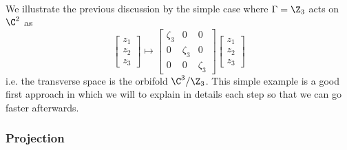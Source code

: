 \documentclass{worksheetclass}
\begin{document}
        We illustrate the previous discussion by the simple case where $\Gamma=\Z_3$ acts on $\C^2$ as
        \begin{equation}
            \begin{bmatrix}
                z_1\\z_2\\z_3
            \end{bmatrix}\mapsto
            \begin{bmatrix}
                \zeta_3 & 0 & 0 \\
                0 & \zeta_3 & 0 \\
                0 & 0 & \zeta_3
            \end{bmatrix}
            \begin{bmatrix}
                z_1\\z_2\\z_3
            \end{bmatrix}
        \end{equation}
        i.e. the transverse space is the orbifold $\C^3/\Z_3$. This simple example is a good first approach in which we will to explain in details each step so that we can go faster afterwards.

        \subsubsection{Projection}
\end{document}
